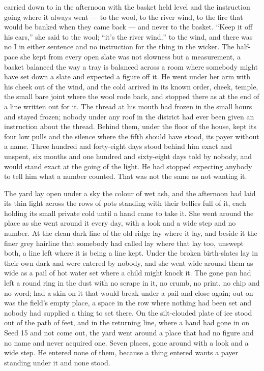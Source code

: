  carried  down to  in the afternoon with the basket held level and the instruction going where it always went --- to the wool, to the river wind, to the fire that would be banked when they came back --- and never to the basket. “Keep it off his ears,” she said to the wool; “it’s the river wind,” to the wind, and there was no I in either sentence and no instruction for the thing in the wicker. The half-pace she kept from every open slate was not slowness but a measurement, a basket balanced the way a tray is balanced across a room where somebody might have set down a slate and expected a figure off it. He went under her arm with his cheek out of the wind, and the cold arrived in its known order, cheek, temple, the small bare joint where the wool rode back, and stopped there as at the end of a line written out for it. The thread at his mouth had frozen in the small hours and stayed frozen; nobody under any roof in the district had ever been given an instruction about the thread. Behind them, under the floor of the house,  kept its four low pulls and the silence where the fifth should have stood, its payer without a name. Three hundred and forty-eight days stood behind him exact and unspent, six months and one hundred and sixty-eight days told by nobody, and would stand exact at the going of the light. He had stopped expecting anybody to tell him what a number counted. That was not the same as not wanting it.

The yard lay open under a sky the colour of wet ash, and the afternoon had laid its thin light across the rows of pots standing with their bellies full of it, each holding its small private cold until a hand came to take it. She went around the place as she went around it every day, with a look and a wide step and no number. At  the clean dark line of the old  ridge lay where it lay, and beside it the finer grey hairline that somebody had called  lay where that lay too, unswept both, a line left where it is being a line kept. Under  the broken birth-slates lay in their own dark and were entered by nobody, and she went wide around them as wide as a pail of hot water set where a child might knock it. The gone pan had left a round ring in the dust with no scrape in it, no crumb, no print, no chip and no word;  had a skin on it that would break under a pail and close again; out on  was the field’s empty place, a space in the row where nothing had been set and nobody had supplied a thing to set there. On  the silt-clouded plate of ice stood out of the path of feet, and in the returning line, where a hand had gone in on Seed 15 and not come out, the yard went around a place that had no figure and no name and never acquired one. Seven places, gone around with a look and a wide step. He entered none of them, because a thing entered wants a payer standing under it and none stood.

